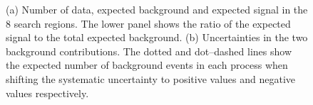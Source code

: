 \begin{figure}[hbt]
  \begin{center} 
   \caption{(a) Number of data, expected background and expected signal in the 8 search regions. The lower panel shows the ratio of the expected signal to the total expected background. 
(b) Uncertainties in the two background contributions. The dotted and dot--dashed lines show the expected number of background events in each process when shifting the systematic uncertainty to positive values and negative values respectively.}
   \label{fig:toy-example} 
  \end{center}
\end{figure}

